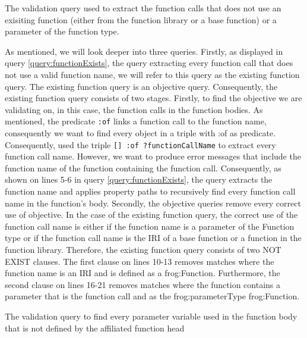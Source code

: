 \begin{query}
    The validation query used to extract the function calls that does not use an exisiting function (either from the function library or a base function) or a parameter of the function type. 
    \label{query:functionExists}
\end{query}


\para 
As mentioned, we will look deeper into three queries. Firstly, as displayed in query \ref{query:functionExists}, the query extracting every function call that does not use a valid function name, we will refer to this query as the existing function query. The existing function query is an objective query. Consequently, the existing function query consists of two stages. Firstly, to find the objective we are validating on, in this case, the function calls in the function bodies. As mentioned, the predicate \lstinline{:of} links a function call to the function name, consequently we want to find every object in a triple with :of as predicate. Consequently, used the triple \lstinline{[] :of ?functionCallName} to extract every function call name. However, we want to produce error messages that include the function name of the function containing the function call. Consequently, as shown on lines 5-6 in query \ref{query:functionExists}, the query extracts the function name and applies property paths to recursively find every function call name in the function's body. Secondly, the objective queries remove every correct use of objective. In the case of the existing function query, the correct use of the function call name is either if the function name is a parameter of the Function type or if the function call name is the IRI of a base function or a function in the function library. Therefore, the existing function query consists of two NOT EXIST clauses. The first clause on lines 10-13 removes matches where the function name is an IRI and is defined as a frog:Function. Furthermore, the second clause on lines 16-21 removes matches where the function contains a parameter that is the function call and as the frog:parameterType frog:Function. 

\begin{query}
    The validation query to find every parameter variable used in the function body that is not defined by the affiliated function head 
    \label{query:undefinedParameter}
\end{query}


